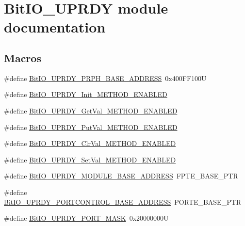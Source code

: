 \hypertarget{group___bit_i_o___u_p_r_d_y__module}{\section{Bit\-I\-O\-\_\-\-U\-P\-R\-D\-Y module documentation}
\label{group___bit_i_o___u_p_r_d_y__module}
}
\subsection*{Macros}
\begin{DoxyCompactItemize}
\item 
\#define \hyperlink{group___bit_i_o___u_p_r_d_y__module_ga51a0822f78e5d20697e924e2478ce524}{Bit\-I\-O\-\_\-\-U\-P\-R\-D\-Y\-\_\-\-P\-R\-P\-H\-\_\-\-B\-A\-S\-E\-\_\-\-A\-D\-D\-R\-E\-S\-S}~0x400\-F\-F100\-U
\item 
\#define \hyperlink{group___bit_i_o___u_p_r_d_y__module_ga3c95c6adb24d97d1abc68de667f55c3d}{Bit\-I\-O\-\_\-\-U\-P\-R\-D\-Y\-\_\-\-Init\-\_\-\-M\-E\-T\-H\-O\-D\-\_\-\-E\-N\-A\-B\-L\-E\-D}
\item 
\#define \hyperlink{group___bit_i_o___u_p_r_d_y__module_gaa421d82787d8e03984e6c4dfe4bfc042}{Bit\-I\-O\-\_\-\-U\-P\-R\-D\-Y\-\_\-\-Get\-Val\-\_\-\-M\-E\-T\-H\-O\-D\-\_\-\-E\-N\-A\-B\-L\-E\-D}
\item 
\#define \hyperlink{group___bit_i_o___u_p_r_d_y__module_ga95b04631fe531abadb5e08f4ad2e8838}{Bit\-I\-O\-\_\-\-U\-P\-R\-D\-Y\-\_\-\-Put\-Val\-\_\-\-M\-E\-T\-H\-O\-D\-\_\-\-E\-N\-A\-B\-L\-E\-D}
\item 
\#define \hyperlink{group___bit_i_o___u_p_r_d_y__module_ga386284e84c5b278c90b8ce68ef53e8c1}{Bit\-I\-O\-\_\-\-U\-P\-R\-D\-Y\-\_\-\-Clr\-Val\-\_\-\-M\-E\-T\-H\-O\-D\-\_\-\-E\-N\-A\-B\-L\-E\-D}
\item 
\#define \hyperlink{group___bit_i_o___u_p_r_d_y__module_ga8ce15fa691b2b0fb8c50db122c7ab38f}{Bit\-I\-O\-\_\-\-U\-P\-R\-D\-Y\-\_\-\-Set\-Val\-\_\-\-M\-E\-T\-H\-O\-D\-\_\-\-E\-N\-A\-B\-L\-E\-D}
\item 
\#define \hyperlink{group___bit_i_o___u_p_r_d_y__module_gaa97e1d3f9303f898ba733895b645837b}{Bit\-I\-O\-\_\-\-U\-P\-R\-D\-Y\-\_\-\-M\-O\-D\-U\-L\-E\-\_\-\-B\-A\-S\-E\-\_\-\-A\-D\-D\-R\-E\-S\-S}~F\-P\-T\-E\-\_\-\-B\-A\-S\-E\-\_\-\-P\-T\-R
\item 
\#define \hyperlink{group___bit_i_o___u_p_r_d_y__module_ga6c240a1fd8e49c6f91424dc2aed3dfd2}{Bit\-I\-O\-\_\-\-U\-P\-R\-D\-Y\-\_\-\-P\-O\-R\-T\-C\-O\-N\-T\-R\-O\-L\-\_\-\-B\-A\-S\-E\-\_\-\-A\-D\-D\-R\-E\-S\-S}~P\-O\-R\-T\-E\-\_\-\-B\-A\-S\-E\-\_\-\-P\-T\-R
\item 
\#define \hyperlink{group___bit_i_o___u_p_r_d_y__module_ga80714ef5e459d91af12df42b032775e7}{Bit\-I\-O\-\_\-\-U\-P\-R\-D\-Y\-\_\-\-P\-O\-R\-T\-\_\-\-M\-A\-S\-K}~0x20000000\-U
\end{DoxyCompactItemize}
